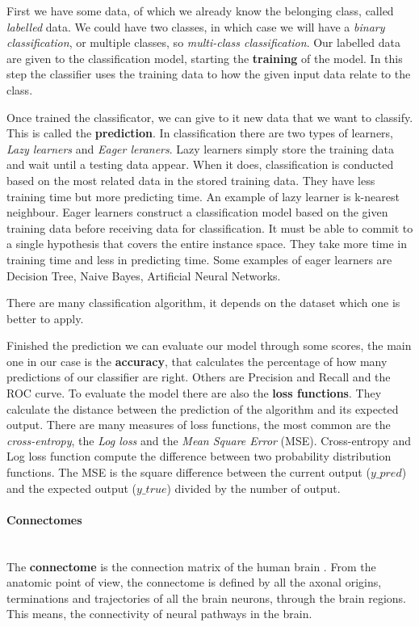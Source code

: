 First we have some data, of which we already know the belonging class, called \emph{labelled} data. We could have two classes, in which case we will have a \emph{binary classification}, or multiple classes, so \emph{multi-class classification}. Our labelled data are given to the classification model, starting the \textbf{training} of the model. In this step the classifier uses the training data to how the given input data relate to the class.


Once trained the classificator, we can give to it new data that we want to classify. This is called the \textbf{prediction}. In classification there are two types of learners, \textit{Lazy learners} and \textit{Eager leraners}. Lazy learners simply store the training data and wait until a testing data appear. When it does, classification is conducted based on the most related data in the stored training data. They have less training time but more predicting time. An example of lazy learner is k-nearest neighbour. Eager learners construct a classification model based on the given training data before receiving data for classification. It must be able to commit to a single hypothesis that covers the entire instance space. They take more time in training time and less in predicting time. Some examples of eager learners are Decision Tree, Naive Bayes, Artificial Neural Networks. 

There are many classification algorithm, it depends on the dataset which one is better to apply. 

Finished the prediction we can evaluate our model through some scores, the main one in our case is the \textbf{accuracy}, that calculates the percentage of how many predictions of our classifier are right. Others are Precision and Recall and the ROC curve. To evaluate the model there are also the \textbf{loss functions}. They calculate the distance between the prediction of the algorithm and its expected output. There are many measures of loss functions, the most common are the \textit{cross-entropy}, the \textit{Log loss} and the \textit{Mean Square Error} (MSE). Cross-entropy and Log loss function compute the difference between two probability distribution functions. The MSE is the square difference between the current output ($y\_pred$) and the expected output ($y\_true$) divided by the number of output. 

\paragraph{Connectomes}\
\\
The \textbf{connectome} is the connection matrix of the human brain \cite{connectome}. From the anatomic point of view, the connectome is defined by all the axonal origins, terminations and trajectories of all the brain neurons, through the brain regions. This means, the connectivity of neural pathways in the brain. 

